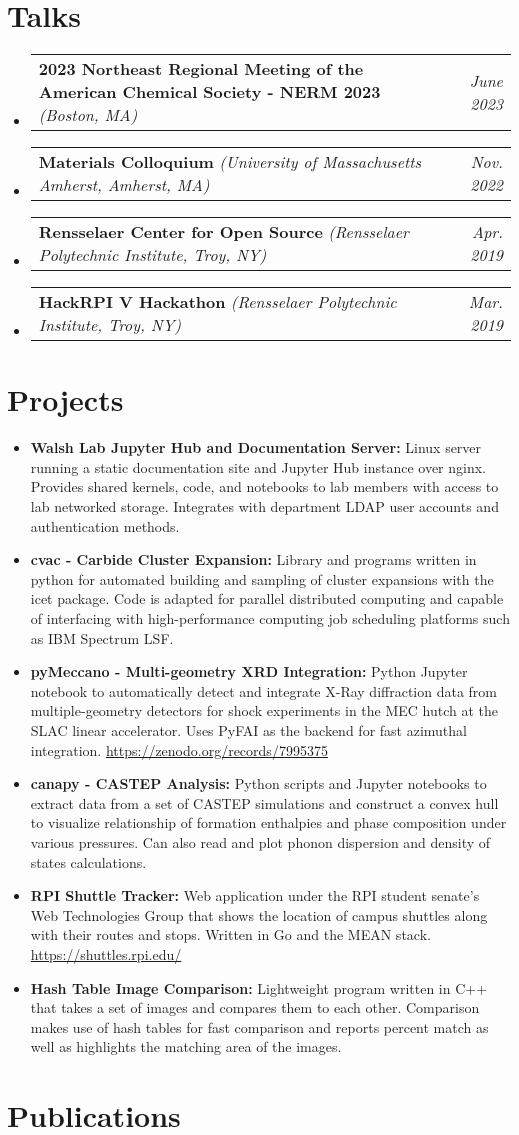 \documentclass[letterpaper,11pt]{article}
\makeatletter
\newcommand{\presentation}[3]{
    \vspace{-2pt}
    \scriptsize
    \item[]
    \begin{tabularx}{\textwidth}{l@{\extracolsep{\fill}}r}
        \textbf{#1} \textit{(#2)} & \textit{#3} \\
    \end{tabularx}\vspace{-12pt}
}
\newcommand{\project}[2]{
    \vspace{-4pt} 
    \item 
    \small 
    \textbf{#1:}
    {#2 
        \vspace{-2pt}
    }
}
\makeatother
\begin{document}
\section{Talks}
    \vspace{4pt}
    \begin{itemize}[leftmargin=0pt]
        \presentation{2023 Northeast Regional Meeting of the American Chemical Society - NERM 2023}{Boston, MA}{June 2023}
        \presentation{Materials Colloquium}{University of Massachusetts Amherst, Amherst, MA}{Nov. 2022}
        \presentation{Rensselaer Center for Open Source}{Rensselaer Polytechnic Institute, Troy, NY}{Apr. 2019}
        \presentation{HackRPI V Hackathon}{Rensselaer Polytechnic Institute, Troy, NY}{Mar. 2019}
    \end{itemize}

\vspace{2pt}
\section{Projects}
    \vspace{4pt}
    \begin{itemize}[leftmargin=*]
        \project{Walsh Lab Jupyter Hub and Documentation Server}
            {Linux server running a static documentation site and Jupyter Hub instance over nginx. Provides shared kernels, code, and notebooks to lab members with access to lab networked storage. Integrates with department LDAP user accounts and authentication methods.}
        \project{cvac - Carbide Cluster Expansion}
            {Library and programs written in python for automated building and sampling of cluster expansions with the icet package. Code is adapted for parallel distributed computing and capable of interfacing with high-performance computing job scheduling platforms such as IBM Spectrum LSF.}
        \project{pyMeccano - Multi-geometry XRD Integration}
            {Python Jupyter notebook to automatically detect and integrate X-Ray diffraction data from multiple-geometry detectors for shock experiments in the MEC hutch at the SLAC linear accelerator. Uses PyFAI as the backend for fast azimuthal integration. \url{https://zenodo.org/records/7995375}}
        \project{canapy - CASTEP Analysis}
            {Python scripts and Jupyter notebooks to extract data from a set of CASTEP simulations and construct a convex hull to visualize relationship of formation enthalpies and phase composition under various pressures. Can also read and plot phonon dispersion and density of states calculations.}
        \project{RPI Shuttle Tracker}
            {Web application under the RPI student senate’s Web Technologies Group that shows the location of campus shuttles along with their routes and stops. Written in Go and the MEAN stack. \url{https://shuttles.rpi.edu/}}
        \project{Hash Table Image Comparison}
            {Lightweight program written in C++ that takes a set of images and compares them to each other. Comparison makes use of hash tables for fast comparison and reports percent match as well as highlights the matching area of the images.}
    \end{itemize}


\section{Publications}
\nocite{*}
\printbibliography[heading=none]
\end{document}
